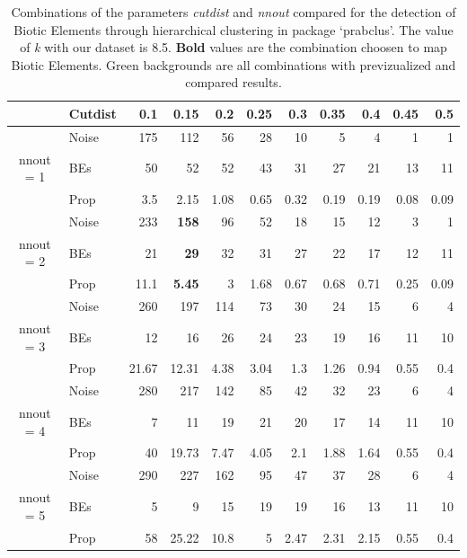 \documentclass[12pt,openright,oneside,a4paper,english]{abntex2}
\begin{document}
\begin{table}[H]
	\caption*{\small Combinations of the parameters \textit{cutdist} and \textit{nnout} compared for the detection of Biotic Elements through hierarchical clustering in package ‘prabclus’. The value of \textit{k} with our dataset is 8.5. \textbf{Bold} values are the combination choosen to map Biotic Elements. Green backgrounds are all combinations with previzualized and compared results.}
	\label{}
	\centering
	\vspace{\bigskipamount}
	\footnotesize
	\begin{tabular}{c l r r r r r r r r r}
		\hline
					&\textbf{Cutdist}	& \textbf{0.1}	& \textbf{0.15}	& \textbf{0.2}	& \textbf{0.25}	& \textbf{0.3}	& \textbf{0.35}	& \textbf{0.4}	& \textbf{0.45}	& \textbf{0.5}\\
		\hline	
					&Noise	& 175	& 112	& 56	& 28	& 10	& 5	& 4	& 1	& 1\\
nnout = 1	&BEs	& 50	& 52	& 52	& 43	& 31	& 27	& 21	& 13	& 11\\
					&Prop	& 3.5	& 2.15	& 1.08	& 0.65	& 0.32	& 0.19	& 0.19	& 0.08	& 0.09\\
		\hline
					&Noise	& \cellcolor{lightgray}233	& \cellcolor{lightgray}\textbf{158}	& 96	& 52	& 18	& 15	& 12	& 3	& 1\\
nnout = 2	&BEs	& \cellcolor{lightgray}21	& \cellcolor{lightgray}\textbf{29}	& 32	& 31	& 27	& 22	& 17	& 12	& 11\\
					&Prop	& \cellcolor{lightgray}11.1	& \cellcolor{lightgray}\textbf{5.45}	& 3	& 1.68	& 0.67	& 0.68	& 0.71	& 0.25	& 0.09\\
		\hline
					&Noise	& 260	& \cellcolor{lightgray}197	& \cellcolor{lightgray}114	& 73	& 30	& 24	& 15	& 6	& 4\\
nnout = 3	&BEs	& 12	& \cellcolor{lightgray}16	& \cellcolor{lightgray}26	& 24	& 23	& 19	& 16	& 11	& 10\\
					&Prop	& 21.67	& \cellcolor{lightgray}12.31	& \cellcolor{lightgray}4.38	& 3.04	& 1.3	& 1.26	& 0.94	& 0.55	& 0.4\\
		\hline
					&Noise	& 280	& 217	& \cellcolor{lightgray}142	& 85	& 42	& 32	& 23	& 6	& 4\\
nnout = 4	&BEs	& 7	& 11	& \cellcolor{lightgray}19	& 21	& 20	& 17	& 14	& 11	& 10\\
					&Prop	& 40	& 19.73	& \cellcolor{lightgray}7.47	& 4.05	& 2.1	& 1.88	& 1.64	& 0.55	& 0.4\\
		\hline
					&Noise	& 290	& 227	& 162	& 95	& 47	& 37	& 28	& 6	& 4\\
nnout = 5	&BEs	& 5	& 9	& 15	& 19	& 19	& 16	& 13	& 11	& 10\\
					&Prop	& 58	& 25.22	& 10.8	& 5	& 2.47	& 2.31	& 2.15	& 0.55	& 0.4\\
		\hline
	\end{tabular}
\end{table}
\end{document}

